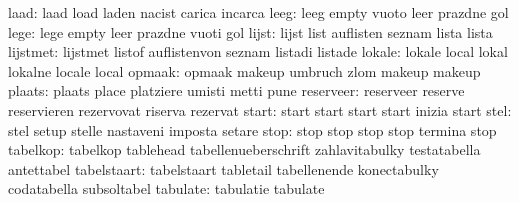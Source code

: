                      laad: laad                      load
                           laden                     nacist
                           carica                    incarca
                     leeg: leeg                      empty
                           vuoto                     leer
                           prazdne                   gol
                     lege: lege                      empty
                           leer                      prazdne
                           vuoti                     gol
                    lijst: lijst                     list
                           auflisten                 seznam
                           lista                     lista
                 lijstmet: lijstmet                  listof
                           auflistenvon              seznam
                           listadi                   listade
                   lokale: lokale                    local
                           lokal                     lokalne
                           locale                    local
                   opmaak: opmaak                    makeup
                           umbruch                   zlom
                           makeup                    makeup %
                   plaats: plaats                    place
                           platziere                 umisti
                           metti                     pune
                reserveer: reserveer                 reserve
                           reservieren               rezervovat
                           riserva                   rezervat
                    start: start                     start
                           start                     start
                           inizia                    start
                     stel: stel                      setup
                           stelle                    nastaveni
                           imposta                   setare
                     stop: stop                      stop
                           stop                      stop
                           termina                   stop
                 tabelkop: tabelkop                  tablehead
                           tabellenueberschrift      zahlavitabulky
                           testatabella              antettabel %
              tabelstaart: tabelstaart               tabletail
                           tabellenende              konectabulky
                           codatabella               subsoltabel %
                 tabulate: tabulatie                 tabulate
